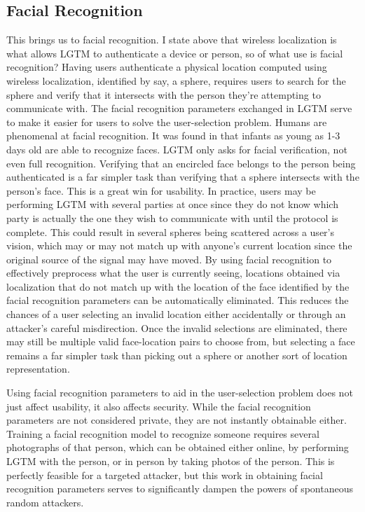 \documentclass[12pt]{report}
\begin{document}
\subsection{Facial Recognition}
This brings us to facial recognition. I state above that wireless localization is what allows LGTM to authenticate a device or person, so of what use is facial recognition? Having users authenticate a physical location computed using wireless localization, identified by say, a sphere, requires users to search for the sphere and verify that it intersects with the person they're attempting to communicate with. The facial recognition parameters exchanged in LGTM serve to make it easier for users to solve the user-selection problem. Humans are phenomenal at facial recognition. It was found in \cite{NewbornsFaceRecognitionTurati2006} that infants as young as 1-3 days old are able to recognize faces. LGTM only asks for facial verification, not even full recognition. Verifying that an encircled face belongs to the person being authenticated is a far simpler task than verifying that a sphere intersects with the person's face. This is a great win for usability. In practice, users may be performing LGTM with several parties at once since they do not know which party is actually the one they wish to communicate with until the protocol is complete. This could result in several spheres being scattered across a user's vision, which may or may not match up with anyone's current location since the original source of the signal may have moved. By using facial recognition to effectively preprocess what the user is currently seeing, locations obtained via localization that do not match up with the location of the face identified by the facial recognition parameters can be automatically eliminated. This reduces the chances of a user selecting an invalid location either accidentally or through an attacker's careful misdirection. Once the invalid selections are eliminated, there may still be multiple valid face-location pairs to choose from, but selecting a face remains a far simpler task than picking out a sphere or another sort of location representation. \par

Using facial recognition parameters to aid in the user-selection problem does not just affect usability, it also affects security. While the facial recognition parameters are not considered private, they are not instantly obtainable either. Training a facial recognition model to recognize someone requires several photographs of that person, which can be obtained either online, by performing LGTM with the person, or in person by taking photos of the person. This is perfectly feasible for a targeted attacker, but this work in obtaining facial recognition parameters serves to significantly dampen the powers of spontaneous random attackers. \par
\end{document}

